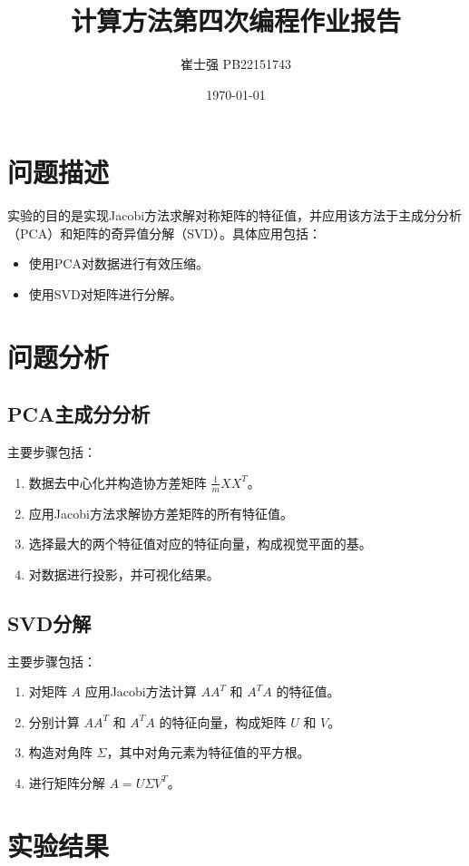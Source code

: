 \documentclass[UTF8]{ctexart}
\title{计算方法第四次编程作业报告}
\author{崔士强 PB22151743}
\date{\today}
\begin{document}
\maketitle

\section{问题描述}
实验的目的是实现Jacobi方法求解对称矩阵的特征值，并应用该方法于主成分分析（PCA）和矩阵的奇异值分解（SVD）。具体应用包括：
\begin{itemize}
    \item 使用PCA对数据进行有效压缩。
    \item 使用SVD对矩阵进行分解。
\end{itemize}

\section{问题分析}
\subsection{PCA主成分分析}
主要步骤包括：
\begin{enumerate}
    \item 数据去中心化并构造协方差矩阵 $\frac{1}{m}XX^T$。
    \item 应用Jacobi方法求解协方差矩阵的所有特征值。
    \item 选择最大的两个特征值对应的特征向量，构成视觉平面的基。
    \item 对数据进行投影，并可视化结果。
\end{enumerate}

\subsection{SVD分解}
主要步骤包括：
\begin{enumerate}
    \item 对矩阵 $A$ 应用Jacobi方法计算 $AA^T$ 和 $A^TA$ 的特征值。
    \item 分别计算 $AA^T$ 和 $A^TA$ 的特征向量，构成矩阵 $U$ 和 $V$。
    \item 构造对角阵 $\Sigma$，其中对角元素为特征值的平方根。
    \item 进行矩阵分解 $A = U\Sigma V^T$。
\end{enumerate}

\section{实验结果}
\end{document}
